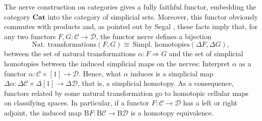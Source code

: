 \documentclass[]{amsart}
\begin{document}
The nerve construction on categories gives a fully faithful functor, embedding the category ${\ensuremath{\mathbf{Cat}}}$
into the category of simplicial sets. Moreover, this functor obviously commutes with products and,
as pointed out by Segal \cite[Proposition 2.1]{segal}, these facts imply that, for any two functors
$F,G:{\mathcal C}\to {\mathcal D}$, the functor nerve defines a bijection
$$\text{Nat. transformations} (F,G)\cong ~\text{Simpl. homotopies}(\Delta F, \Delta G),$$
between the set of natural transformations $\alpha:F\Rightarrow G$ and the set of simplicial
homotopies between the induced simplicial maps on the nerves: Interpret $\alpha$ as a functor
$\alpha:{\mathcal C} \times [1]\rightarrow {\mathcal D}$. Hence, what $\alpha$ induces is a
simplicial map $\Delta \alpha:\Delta{\mathcal C}\times \Delta[1]\to \Delta{\mathcal D}$, that is, a
simplicial homotopy. As a consequence, functors related by some natural transformation go to
homotopic cellular maps on classifying spaces. In particular, if a functor $F:{\mathcal C}\to
{\mathcal D}$ has a left or right adjoint, the induced map ${\ensuremath{\mathrm{B}}} F:{\ensuremath{\mathrm{B}}}{\mathcal C}\to {\ensuremath{\mathrm{B}}}
{\mathcal D}$ is a homotopy equivalence.
\end{document}
